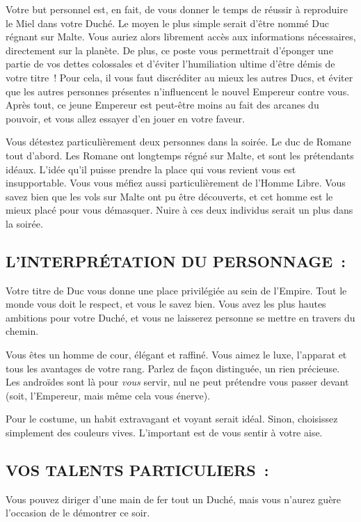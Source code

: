 \documentclass[14pt,twocolumn]{extarticle}
\begin{document}
Votre but personnel est, en fait, de vous donner le temps de réussir à
reproduire le Miel dans votre Duché. Le moyen le plus simple serait d'être
nommé Duc régnant sur Malte. Vous auriez alors librement accès aux informations
nécessaires, directement sur la planète. De plus, ce poste vous permettrait
d'éponger une partie de vos dettes colossales et d'éviter l'humiliation ultime
d'être démis de votre titre~! Pour cela, il vous faut discréditer au mieux les
autres Ducs, et éviter que les autres personnes présentes n'influencent le
nouvel Empereur contre vous.  Après tout, ce jeune Empereur est peut-être moins
au fait des arcanes du pouvoir, et vous allez essayer d'en jouer en votre
faveur.

Vous détestez particulièrement deux personnes dans la soirée. Le duc de Romane
tout d'abord. Les Romane ont longtemps régné sur Malte, et sont les prétendants
idéaux. L'idée qu'il puisse prendre la place qui vous revient vous est
insupportable. Vous vous méfiez aussi particulièrement de l'Homme Libre. Vous
savez bien que les vols sur Malte ont pu être découverts, et cet homme est le
mieux placé pour vous démasquer. Nuire à ces deux individus serait un plus dans
la soirée.

\subsection{L'INTERPRÉTATION DU PERSONNAGE~:}

Votre titre de Duc vous donne une place privilégiée au sein de l'Empire. Tout
le monde vous doit le respect, et vous le savez bien. Vous avez les plus hautes
ambitions pour votre Duché, et vous ne laisserez personne se mettre en travers
du chemin.

Vous êtes un homme de cour, élégant et raffiné. Vous aimez le luxe, l'apparat
et tous les avantages de votre rang. Parlez de façon distinguée, un rien
précieuse. Les androïdes sont là pour \emph{vous} servir, nul ne peut prétendre
vous passer devant (soit, l'Empereur, mais même cela vous énerve).

Pour le costume, un habit extravagant et voyant serait idéal. Sinon, choisissez
simplement des couleurs vives. L'important est de vous sentir à votre aise.


\subsection{VOS TALENTS PARTICULIERS~:}

Vous pouvez diriger d'une main de fer tout un Duché, mais vous n'aurez guère
l'occasion de le démontrer ce soir.
\end{document}
